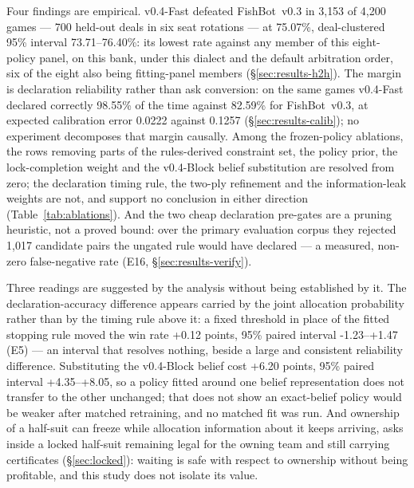 \documentclass[11pt]{article}
\theoremstyle{definition}
\DeclareRobustCommand{\vfast}{\texorpdfstring{\mbox{v0.4-Fast}}{v0.4-Fast}}
\DeclareRobustCommand{\vblock}{\texorpdfstring{\mbox{v0.4-Block}}{v0.4-Block}}
\DeclareRobustCommand{\vthree}{\texorpdfstring{\mbox{FishBot v0.3}}{FishBot v0.3}}
\newcommand{\numHtHGames}{4{,}200}
\newcommand{\numHtHDeals}{700}
\newcommand{\numVsVthree}{75.07}
\newcommand{\numVsVthreeCI}{73.71--76.40}
\newcommand{\numVsVthreeWins}{3{,}153}
\newcommand{\numVsVthreeDeclAcc}{98.55}
\newcommand{\numVthreeDeclAccSame}{82.59}
\newcommand{\numAblBlock}{+6.20}
\newcommand{\numAblBlockCI}{+4.35--+8.05}
\newcommand{\numAblStop}{+0.12}
\newcommand{\numAblStopCI}{-1.23--+1.47}
\newcommand{\numDeclECE}{0.0222}
\newcommand{\numVthreeDeclECE}{0.1257}
\newcommand{\numGateFalseNeg}{1{,}017}
\begin{document}
Four findings are empirical. \vfast{} defeated \vthree{} in \numVsVthreeWins{}
of \numHtHGames{} games --- \numHtHDeals{} held-out deals in six seat rotations
--- at \numVsVthree\%, deal-clustered 95\% interval \numVsVthreeCI\%: its lowest
rate against any member of this eight-policy panel, on this bank, under this
dialect and the default arbitration order, six of the eight also being
fitting-panel members (\S\ref{sec:results-h2h}). The margin is declaration
reliability rather than ask conversion: on the same games \vfast{} declared
correctly \numVsVthreeDeclAcc\% of the time against \numVthreeDeclAccSame\% for
\vthree{}, at expected calibration error \numDeclECE{} against \numVthreeDeclECE{}
(\S\ref{sec:results-calib}); no experiment decomposes that margin causally.
Among the frozen-policy ablations, the rows removing parts of the rules-derived
constraint set, the policy prior, the lock-completion weight and the \vblock{}
belief substitution are resolved from zero; the declaration timing rule, the
two-ply refinement and the information-leak weights are not, and support no
conclusion in either direction (Table~\ref{tab:ablations}). And the two cheap
declaration pre-gates are a pruning heuristic, not a proved bound: over the
primary evaluation corpus they rejected \numGateFalseNeg{} candidate pairs the
ungated rule would have declared --- a measured, non-zero false-negative rate
(E16, \S\ref{sec:results-verify}).

Three readings are suggested by the analysis without being established by it.
The declaration-accuracy difference appears carried by the joint allocation
probability rather than by the timing rule above it: a fixed threshold in place
of the fitted stopping rule moved the win rate \numAblStop{} points, 95\% paired
interval \numAblStopCI{} (E5) --- an interval that resolves nothing, beside a
large and consistent reliability difference. Substituting the \vblock{} belief
cost \numAblBlock{} points, 95\% paired interval \numAblBlockCI{}, so a policy
fitted around one belief representation does not transfer to the other
unchanged; that does not show an exact-belief policy would be weaker after
matched retraining, and no matched fit was run. And ownership of a half-suit can
freeze while allocation information about it keeps arriving, asks inside a
locked half-suit remaining legal for the owning team and still carrying
certificates (\S\ref{sec:locked}): waiting is safe with respect to ownership
without being profitable, and this study does not isolate its value.
\end{document}
